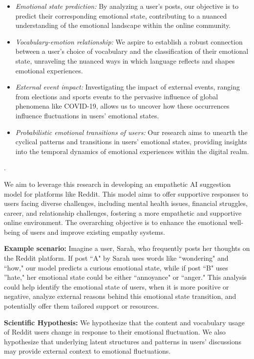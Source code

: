 \documentclass[conference,compsoc]{IEEEtran}
\begin{document}
\begin{itemize}
    \item \textit{Emotional state prediction:}
    By analyzing a user's posts, our objective is to predict their corresponding emotional state, contributing to a nuanced understanding of the emotional landscape within the online community.
    \item \textit{Vocabulary-emotion relationship:}
    We aspire to establish a robust connection between a user's choice of vocabulary and the classification of their emotional state, unraveling the nuanced ways in which language reflects and shapes emotional experiences.
    \item \textit{External event impact:}
    Investigating the impact of external events, ranging from elections and sports events to the pervasive influence of global phenomena like COVID-19, allows us to uncover how these occurrences influence fluctuations in users' emotional states.
    \item \textit{Probabilistic emotional transitions of users:}
    Our research aims to unearth the cyclical patterns and transitions in users' emotional states, providing insights into the temporal dynamics of emotional experiences within the digital realm.
\end{itemize}.  

We aim to leverage this research in developing an empathetic AI suggestion model for platforms like Reddit. This model aims to offer supportive responses to users facing diverse challenges, including mental health issues, financial struggles, career, and relationship challenges, fostering a more empathetic and supportive online environment. The overarching objective is to enhance the emotional well-being of users and improve existing empathy systems.

\textbf{Example scenario: }Imagine a user, Sarah, who frequently posts her thoughts on the Reddit platform. If post ``A" by Sarah uses words like ``wondering" and ``how," our model predicts a curious emotional state, while if post ``B" uses ''hate," her emotional state could be either ``annoyance" or ``anger." This analysis could help identify the emotional state of users, when it is more positive or negative, analyze external reasons behind this emotional state transition, and potentially offer them tailored support or resources.

\textbf{Scientific Hypothesis: }We hypothesize that the content and vocabulary usage of Reddit users change in response to their emotional fluctuation. We also hypothesize that underlying latent structures and patterns in users' discussions may provide external context to emotional fluctuations. 
\end{document}
